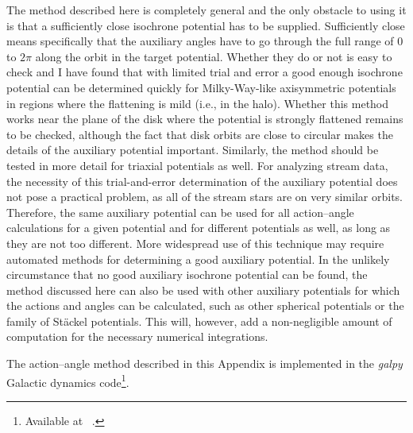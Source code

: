 \documentclass[12pt,preprint]{aastex}
\newcommand{\ie}{i.e.}
\begin{document}
The method described here is completely general and the only obstacle
to using it is that a sufficiently close isochrone potential has to be
supplied. Sufficiently close means specifically that the auxiliary
angles have to go through the full range of $0$ to $2\pi$ along the
orbit in the target potential. Whether they do or not is easy to check
and I have found that with limited trial and error a good enough
isochrone potential can be determined quickly for Milky-Way-like
axisymmetric potentials in regions where the flattening is mild (\ie,
in the halo). Whether this method works near the plane of the disk
where the potential is strongly flattened remains to be checked,
although the fact that disk orbits are close to circular makes the
details of the auxiliary potential important. Similarly, the method
should be tested in more detail for triaxial potentials as well. For
analyzing stream data, the necessity of this trial-and-error
determination of the auxiliary potential does not pose a practical
problem, as all of the stream stars are on very similar
orbits. Therefore, the same auxiliary potential can be used for all
action--angle calculations for a given potential and for different
potentials as well, as long as they are not too different. More
widespread use of this technique may require automated methods for
determining a good auxiliary potential. In the unlikely circumstance
that no good auxiliary isochrone potential can be found, the method
discussed here can also be used with other auxiliary potentials for
which the actions and angles can be calculated, such as other
spherical potentials or the family of St\"{a}ckel potentials. This
will, however, add a non-negligible amount of computation for the
necessary numerical integrations.

The action--angle method described in this Appendix is implemented in
the \emph{galpy} Galactic dynamics code\footnote{Available at
  ~.}.

\end{document}
